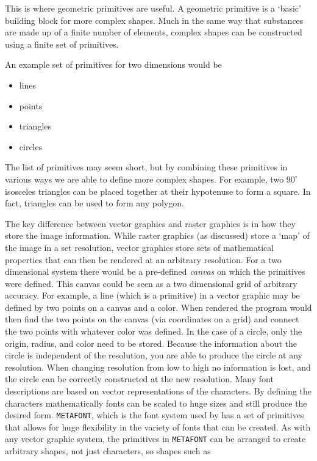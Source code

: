 \documentclass[authoryearcitations]{UoYCSproject}
\begin{document}
This is where geometric primitives are useful. A geometric primitive is a `basic' building block for more complex shapes. 
Much in the same way that substances are made up of a finite number of elements, complex shapes can be constructed using
a finite set of primitives. 

An example set of primitives for two dimensions would be

\begin{itemize}
        \item lines
        \item points
        \item triangles
        \item circles
\end{itemize}

The list of primitives may seem short, but by combining these primitives in various ways we are able to define more
complex shapes. For example, two $90^{\circ}$ isosceles triangles can be placed together at their hypotenuse to form 
a square. In fact, triangles can be used to form any polygon. 

The key difference between vector graphics and raster graphics is in how they store the image information. While raster
graphics (as discussed) store a `map' of the image in a set resolution, vector graphics store sets of mathematical properties
that can then be rendered at an arbitrary resolution. For a two dimensional system there would be a pre-defined
\emph{canvas} on which the primitives were defined. This canvas could be seen as a two dimensional grid of arbitrary accuracy. 
For example, a line (which is a primitive) in a vector graphic may be defined by two points on a canvas and a color. 
When rendered the program would then find the two points on the canvas (via coordinates on a grid) and connect the two 
points with whatever color was defined. In the case of a circle, only the origin, radius, and color need to be stored. 
Because the information about the circle is independent of the resolution, you are able to produce the circle at any resolution.
When changing resolution from low to high no information is lost, and the circle can be correctly constructed at the 
new resolution. Many font descriptions are based on vector representations of the characters. By defining the characters
mathematically fonts can be scaled to huge sizes and still produce the desired form. \verb+METAFONT+, which is the font system 
used by \LaTeXe has a set of primitives that allows for huge flexibility in the variety of fonts that can be created. As with
any vector graphic system, the primitives in \verb+METAFONT+ can be arranged to create arbitrary shapes, not just characters,
so shapes such as 
\end{document}
